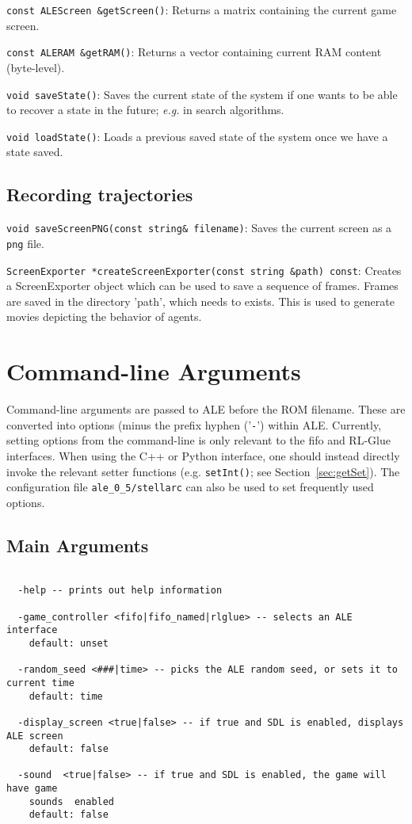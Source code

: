 \documentclass[12pt]{article}
\begin{document}
  \verb+const ALEScreen &getScreen()+: Returns a matrix containing the current game screen.
  
  \verb+const ALERAM &getRAM()+: Returns a vector containing current RAM content (byte-level).
  
  \verb+void saveState()+: Saves the current state of the system if one wants to be able to recover 
  a state in the future; \emph{e.g.} in search algorithms.
  
  \verb+void loadState()+: Loads a previous saved state of the system once we have a state saved.

  \subsection{Recording trajectories}
   
  \indent \indent \verb+void saveScreenPNG(const string& filename)+: Saves the current screen as
  a \verb+png+ file.
  
  \verb+ScreenExporter *createScreenExporter(const string &path) const+: Creates a 
  ScreenExporter object which can be used to save a sequence of frames. Frames are saved 
  in the directory 'path', which needs to exists. This is used to generate movies depicting the behavior
  of agents.
  
\section{Command-line Arguments}\label{sec:arguments}

Command-line arguments are passed to ALE before the ROM filename. These are converted into
options (minus the prefix hyphen ('\verb+-+') within ALE. Currently, 
setting options from the command-line is only relevant to the fifo and RL-Glue interfaces.
When using the C++ or Python interface, one should instead directly invoke the relevant setter
functions (e.g. \verb+setInt()+; see Section~\ref{sec:getSet}). The configuration file 
\verb+ale_0_5/stellarc+ can also be used to set frequently used options. 

\subsection{Main Arguments}
\small{
\begin{verbatim}

  -help -- prints out help information

  -game_controller <fifo|fifo_named|rlglue> -- selects an ALE interface
    default: unset

  -random_seed <###|time> -- picks the ALE random seed, or sets it to current time
    default: time

  -display_screen <true|false> -- if true and SDL is enabled, displays ALE screen
    default: false
    
  -sound  <true|false> -- if true and SDL is enabled, the game will have game
    sounds  enabled
    default: false


\end{verbatim}
}
\end{document}
